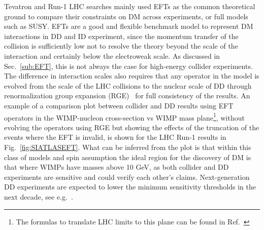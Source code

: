 Tevatron and Run-1 LHC searches mainly used EFTs as the common theoretical ground to compare their constraints on DM across experiments, or full models such as SUSY. EFTs are a good and flexible benchmark model to represent DM interactions in DD and ID experiment, since the momentum transfer of the collision is sufficiently low not to resolve the theory beyond the scale of the interaction and certainly below the electroweak scale. As discussed in Sec.~\ref{sub:EFT}, this is not always the case for high-energy collider experiments. The difference in interaction scales also requires that any operator in the model is evolved from the scale of the LHC collisions to the nuclear scale of DD through renormalization group expansion (RGE)~\cite{DEramo:2014nmf} for full consistency of the results. %
An example of a comparison plot between collider and DD results using EFT operators in the WIMP-nucleon cross-section vs WIMP mass plane\footnote{The formulas to translate LHC limits to this plane can be found in Ref.~\cite{Goodman:2010ku}}, without evolving the operators using RGE but showing the effects of the truncation of the events where the EFT is invalid, is shown for the LHC Run-1 results in Fig.~\ref{fig:SIATLASEFT}. %
What can be inferred from the plot is that within this class of models and spin assumption %
the ideal region for the discovery of DM is that where WIMPs have masses above 10 GeV, as both collider and DD experiments are sensitive and could verify each other's claims. Next-generation DD experiments are expected to lower the minimum sensitivity thresholds in the next decade, see e.g.~\cite{Agnese:2016cpb}. 

